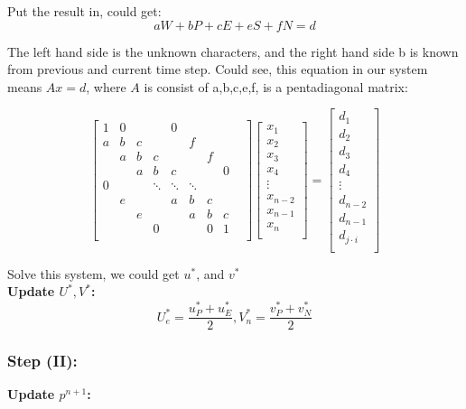 \documentclass[12pt]{article}
\begin{document}
Put the result in, could get:
$$
aW + bP + cE + eS + fN = d
$$


The left hand side is the unknown characters, and the right hand side b is known from previous and current time step. Could see, this equation in our system means $Ax = d$, where $A$ is consist of a,b,c,e,f, is a pentadiagonal matrix:


\[
\begin{bmatrix}
1 & 0 &   &   & 0 &   &    &\\
a & b & c &   &   & f &    &\\
  & a & b & c &   &   & f  &\\
  &   & a & b & c &   &    & 0\\
0 &   &   & \ddots & \ddots & \ddots &  &  \\
  & e &   &   & a & b & c &   &\\
  &   & e &   &   & a & b & c \\
  &   &   & 0 &   &   & 0 & 1 \\
\end{bmatrix}
\begin{bmatrix}
x_1 \\
x_2 \\
x_3 \\
x_4 \\
\vdots \\
x_{n-2} \\
x_{n-1} \\
x_n \\
\end{bmatrix}
=
\begin{bmatrix}
d_1 \\
d_2 \\
d_3 \\
d_4 \\
\vdots \\
d_{n-2} \\
d_{n-1} \\
d_{j\cdot i} \\
\end{bmatrix}
\]


Solve this system, we could get $u^*$, and $v^*$\\



\noindent \textbf{Update $U^*, V^*$:}\\
    $$ U_e^* = \frac{u_P^*+u_E^*}{2} , V_n^* = \frac{v_P^*+v_N^*}{2}$$


\subsubsection{Step (II):}
\textbf{Update $p^{n+1}$:}\\
\end{document}
